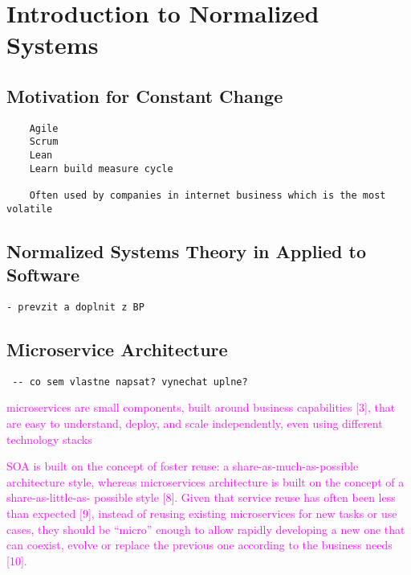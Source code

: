 \documentclass[thesis=M,english,hidelinks]{FITthesis}[2012/10/20]
\begin{document}
% 
% 
\chapter{Introduction to Normalized Systems}
\label{sec:theoretical_background}
\section{Motivation for Constant Change}
\begin{verbatim}
    Agile
    Scrum
    Lean
    Learn build measure cycle
    
    Often used by companies in internet business which is the most volatile 
\end{verbatim}

\section{Normalized Systems Theory in Applied to Software}
\begin{verbatim}
- prevzit a doplnit z BP
\end{verbatim}


\section{Microservice Architecture}
\begin{verbatim}
 -- co sem vlastne napsat? vynechat uplne?
\end{verbatim}
\textcolor{magenta}{
microservices are small components, built around business capabilities [3], that are easy to understand, deploy, and scale independently, even using different technology stacks
}

\textcolor{magenta}{SOA is built on the concept of foster reuse: a share-as-much-as-possible architecture style, whereas microservices architecture is built on the concept of a share-as-little-as- possible style [8]. Given that service reuse has often been less than expected [9], instead of reusing existing microservices for new tasks or use cases, they should be “micro” enough to allow rapidly developing a new one that can coexist, evolve or replace the previous one according to the business needs [10].}
\end{document}
